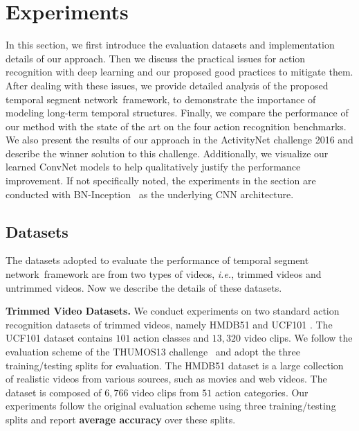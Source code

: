 \documentclass[10pt,journal,compsoc]{IEEEtran}
\newcommand{\SEGNET}{temporal segment network}
\begin{document}
\section{Experiments}
\label{sec:exp}

In this section, we first introduce the evaluation datasets and implementation details of our approach. 
Then we discuss the practical issues for action recognition with deep learning and our proposed good practices to mitigate them.
After dealing with these issues, we provide detailed analysis of the proposed \SEGNET~framework, to demonstrate the importance of modeling long-term temporal structures.
Finally, we compare the performance of our method with the state of the art on the four action recognition benchmarks. 
We also present the results of our approach in the ActivityNet challenge 2016 and describe the winner solution to this challenge. 
Additionally, we visualize our learned ConvNet models to help qualitatively justify the performance improvement.
If not specifically noted, the experiments in the section are conducted with BN-Inception~\cite{IoffeS15} as the underlying CNN architecture.

\subsection{Datasets}

The datasets adopted to evaluate the performance of \SEGNET~framework are from two types of videos, \emph{i.e.}, trimmed videos and untrimmed videos. Now we describe the details of these datasets.

\textbf{Trimmed Video Datasets.} We conduct experiments on two standard action recognition datasets of trimmed videos, namely HMDB51 \cite{KuehneJGPS11} and UCF101 \cite{Soomro12}. The UCF101 dataset contains $ 101 $ action classes and $13,320$ video clips. We follow the evaluation scheme of the THUMOS13 challenge~\cite{THUMOS13} and adopt the three training/testing splits for evaluation. The HMDB51 dataset is a large collection of realistic videos from various sources, such as movies and web videos. The dataset is composed of $6,766$ video clips from $51$ action categories. Our experiments follow the original evaluation scheme using three training/testing splits and report \textbf{average accuracy} over these splits.
\end{document}
